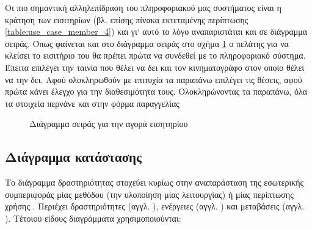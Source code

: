 \documentclass{assignment}
\begin{document}
Οι πιο σημαντική αλληλεπίδραση του πληροφοριακού μας συστήματος είναι η κράτηση των εισιτηρίων (βλ. επίσης πίνακα εκτεταμένης περίπτωσης \ref{table:use_case_member_4}) και γι` αυτό το λόγο αναπαριστάται και σε διάγραμμα σειράς. Όπως φαίνεται και στο διάγραμμα σειράς στο σχήμα \ref{fig:sequence_ticket} ο πελάτης για να κλείσει το εισιτήριο του θα πρέπει πρώτα να συνδεθεί με το πληροφοριακό σύστημα. Έπειτα επιλέγει την ταινία που θέλει να δει και τον κινηματογράφο στον οποίο θέλει να την δει. Αφού ολοκληρωθούν με επιτυχία τα παραπάνω επιλέγει τις θέσεις, αφού πρώτα κάνει έλεγχο για την διαθεσιμότητα τους. Ολοκληρώνοντας τα παραπάνω, όλα τα στοιχεία περνάνε και στην φόρμα παραγγελίας 

\begin{landscape}
\begin{figure}
\begin{center}
\caption{Διάγραμμα σειράς για την αγορά εισητηρίου}
\label{fig:sequence_ticket}
\end{center}
\end{figure}
\end{landscape}

\subsection{Διάγραμμα κατάστασης}

Το διάγραμμα δραστηριότητας στοχεύει κυρίως στην αναπαράσταση της εσωτερικής συμπεριφοράς μίας μεθόδου (την υλοποίηση μίας λειτουργίας) ή μίας περίπτωσης χρήσης \cite{virvou_uml}. Περιέχει δραστηριότητες (αγγλ. ), ενέργειες (αγγλ. ) και μεταβάσεις (αγγλ. ). Τέτοιου είδους διαγράμματα χρησιμοποιούνται:
\end{document}
